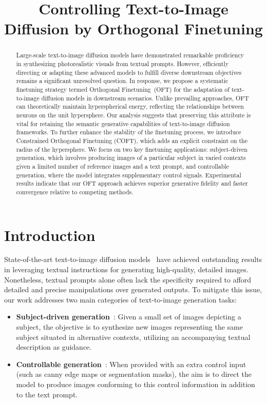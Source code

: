 \title{Controlling Text-to-Image Diffusion by Orthogonal Finetuning}

\begin{abstract}
Large-scale text-to-image diffusion models have demonstrated remarkable proficiency in synthesizing photorealistic visuals from textual prompts. However, efficiently directing or adapting these advanced models to fulfill diverse downstream objectives remains a significant unresolved question. In response, we propose a systematic finetuning strategy termed Orthogonal Finetuning~(OFT) for the adaptation of text-to-image diffusion models in downstream scenarios. Unlike prevailing approaches, OFT can theoretically maintain hyperspherical energy, reflecting the relationships between neurons on the unit hypersphere. Our analysis suggests that preserving this attribute is vital for retaining the semantic generative capabilities of text-to-image diffusion frameworks. To further enhance the stability of the finetuning process, we introduce Constrained Orthogonal Finetuning (COFT), which adds an explicit constraint on the radius of the hypersphere. We focus on two key finetuning applications: subject-driven generation, which involves producing images of a particular subject in varied contexts given a limited number of reference images and a text prompt, and controllable generation, where the model integrates supplementary control signals. Experimental results indicate that our OFT approach achieves superior generative fidelity and faster convergence relative to competing methods.
\end{abstract}

\section{Introduction}

State-of-the-art text-to-image diffusion models~\cite{saharia2022photorealistic,ramesh2022hierarchical,rombach2022high} have achieved outstanding results in leveraging textual instructions for generating high-quality, detailed images. Nonetheless, textual prompts alone often lack the specificity required to afford detailed and precise manipulations over generated outputs. To mitigate this issue, our work addresses two main categories of text-to-image generation tasks:

\begin{itemize}[leftmargin=*,nosep]

    \item \textbf{Subject-driven generation}~\cite{ruiz2023dreambooth}: Given a small set of images depicting a subject, the objective is to synthesize new images representing the same subject situated in alternative contexts, utilizing an accompanying textual description as guidance.
    \item \textbf{Controllable generation}~\cite{zhang2023adding,mou2023t2i}: When provided with an extra control input (such as canny edge maps or segmentation masks), the aim is to direct the model to produce images conforming to this control information in addition to the text prompt.
\end{itemize}

